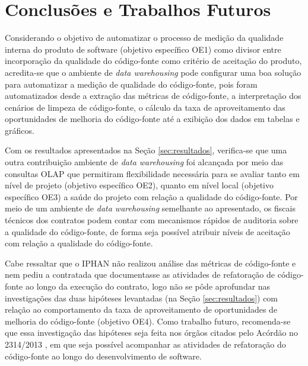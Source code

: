 \section{Conclusões e Trabalhos Futuros}

Considerando o objetivo de automatizar o processo de medição da qualidade interna do produto de software (objetivo específico OE1) como divisor entre incorporação da qualidade do código-fonte como critério de aceitação do produto, acredita-se que o ambiente de \textit{data warehousing} pode configurar uma boa solução para automatizar a medição de qualidade do código-fonte, pois foram automatizados desde a extração das métricas de código-fonte, a interpretação dos cenários de limpeza de código-fonte, o cálculo da taxa de aproveitamento das oportunidades de melhoria do código-fonte até a exibição dos dados em tabelas e gráficos.

Com os resultados apresentados na Seção \ref{sec:resultados}, verifica-se que uma outra contribuição ambiente de \textit{data warehousing} foi alcançada por meio das consultas OLAP que permitiram flexibilidade necessária para se avaliar tanto em nível de projeto (objetivo específico OE2), quanto em nível local (objetivo específico OE3) a saúde do projeto com relação a qualidade do código-fonte. Por meio de um ambiente de \textit{data warehousing} semelhante ao apresentado, os fiscais técnicos dos contratos podem contar com mecanismos rápidos de auditoria sobre a qualidade do código-fonte, de forma seja possível atribuir níveis de aceitação com relação a qualidade do código-fonte. 

Cabe ressaltar que o IPHAN não realizou análise das métricas de código-fonte e nem pediu a contratada que documentasse as atividades de refatoração de código-fonte ao longo da execução do contrato, logo não se pôde aprofundar nas investigações das duas hipóteses levantadas (na Seção \ref{sec:resultados}) com relação ao comportamento da taxa de aproveitamento de oportunidades de melhoria do código-fonte (objetivo OE4). Como trabalho futuro, recomenda-se que essa investigação das hipóteses seja feita nos órgãos citados pelo Acórdão no 2314/2013 \cite{TCU:2013}, em que seja possível acompanhar as atividades de refatoração do código-fonte ao longo do desenvolvimento de software.
